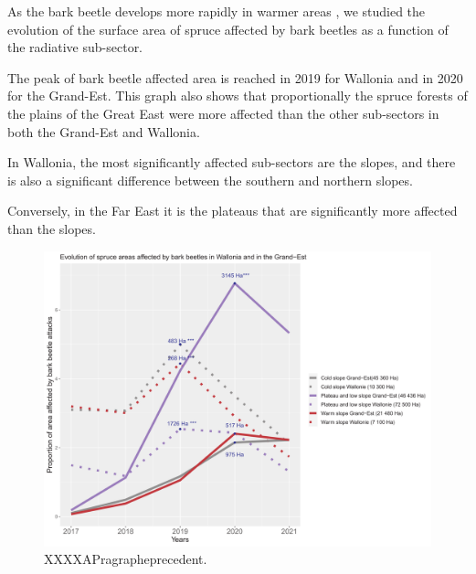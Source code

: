 \documentclass[3p,times]{elsarticle}
\begin{document}
 
 


 As the bark beetle develops more rapidly in warmer areas \citep{annila_influence_1969}, we studied the evolution of the surface area of spruce affected by bark beetles as a function of the radiative sub-sector.

 The peak of bark beetle affected area is reached in 2019 for Wallonia and in 2020 for the Grand-Est.
This graph also shows that proportionally the spruce forests of the plains of the Great East were more affected than the other sub-sectors in both the Grand-Est and Wallonia.
 
 In Wallonia, the most significantly affected sub-sectors are the slopes, and there is also a significant difference between the southern and northern slopes. 
 
Conversely, in the Far East it is the plateaus that are significantly more affected than the slopes.


 
 
 
 



\begin{figure}
\centering
	\includegraphics[width=\textwidth]{evol_ss_GDE_wall.png}
     \caption{XXXXAPragrapheprecedent.}
	\label{ss_sco}
\end{figure}
\end{document}
